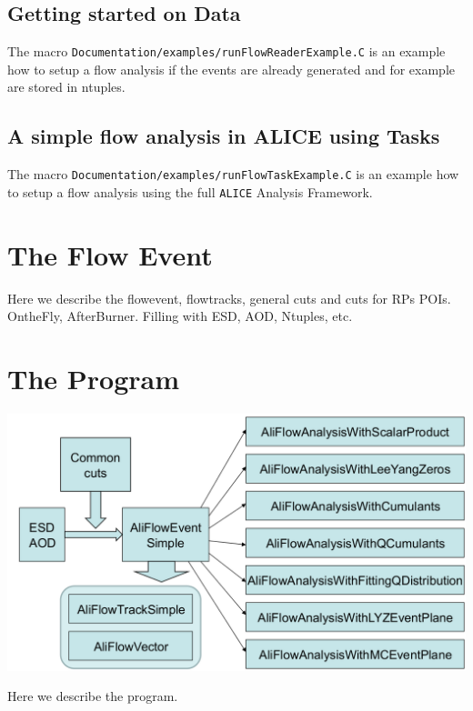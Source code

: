 \documentclass[a5paper]{book}
\numberwithin{equation}{subsection}
\begin{document}
\section{Getting started on Data}

The macro \texttt{Documentation/examples/runFlowReaderExample.C} is an example how to setup a flow analysis if the events are already generated and
for example are stored in ntuples.
 
\section{A simple flow analysis in ALICE using Tasks}
The macro \texttt{Documentation/examples/runFlowTaskExample.C} is an example how to setup a flow analysis using the full \texttt{ALICE} Analysis Framework.

\chapter{The Flow Event}
\label{flowevent}
Here we describe the flowevent, flowtracks, general cuts and cuts for RPs POIs.
OntheFly, AfterBurner. Filling with ESD, AOD, Ntuples, etc.  

\chapter{The Program}
\label{The Program}
\begin{center}
	\includegraphics[width=1.\textwidth]{figs/flowChart.png}
\end{center}
Here we describe the program.
\end{document}
